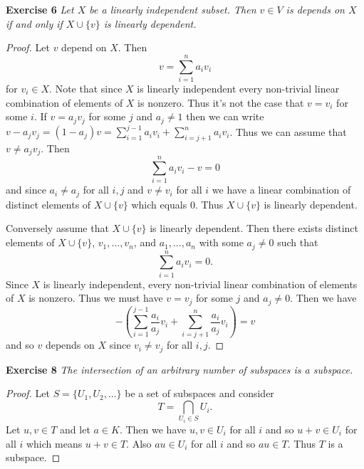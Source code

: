 \documentclass{article}
\begin{document}
\begin{flushleft}
\textbf{Exercise 6}
\textsl{Let $X$ be a linearly independent subset. Then $v \in V$ is depends on $X$ if and only if $X \cup \{v\}$ is linearly dependent.}
\begin{proof}
Let $v$ depend on $X$. Then
\[
v = \sum_{i=1}^n a_i v_i
\]
for $v_i \in X$. Note that since $X$ is linearly independent every non-trivial linear combination of elements of $X$ is nonzero. Thus it's not the case that $v = v_i$ for some $i$. If $v = a_j v_j$ for some $j$ and $a_j \neq 1$ then we can write $v - a_j v_j = (1 - a_j) v = \sum_{i=1}^{j-1} a_i v_i + \sum_{i=j+1}^n a_i v_i$. Thus we can assume that $v \neq a_j v_j$. Then
\[
\sum_{i=1}^n a_i v_i - v = 0
\]
and since $a_i \neq a_j$ for all $i, j$ and $v \neq v_i$ for all $i$ we have a linear combination of distinct elements of $X \cup \{v\}$ which equals $0$. Thus $X \cup \{v\}$ is linearly dependent.\newline

Conversely assume that $X \cup \{v\}$ is linearly dependent. Then there exists distinct elements of $X \cup \{v\}$, $v_1, \dots , v_n$, and $a_1, \dots , a_n$ with some $a_j \neq 0$ such that
\[
\sum_{i=1}^n a_i v_i = 0.
\]
Since $X$ is linearly independent, every non-trivial linear combination of elements of $X$ is nonzero. Thus we must have $v = v_j$ for some $j$ and $a_j \neq 0$. Then we have
\[
-(\sum_{i=1}^{j-1} \frac{a_i}{a_j} v_i + \sum_{i=j+1}^n \frac{a_i}{a_j} v_i) = v
\]
and so $v$ depends on $X$ since $v_i \neq v_j$ for all $i, j$.
\end{proof}

\textbf{Exercise 8}
\textsl{The intersection of an arbitrary number of subspaces is a subspace.}
\begin{proof}
Let $S = \{U_1, U_2, \dots\}$ be a set of subspaces and consider
\[
T = \bigcap_{U_i \in S} U_i.
\]
Let $u,v \in T$ and let $a \in K$. Then we have $u,v \in U_i$ for all $i$ and so $u+v \in U_i$ for all $i$ which means $u + v \in T$. Also $au \in U_i$ for all $i$ and so $au \in T$. Thus $T$ is a subspace.
\end{proof}


\end{flushleft}
\end{document}
